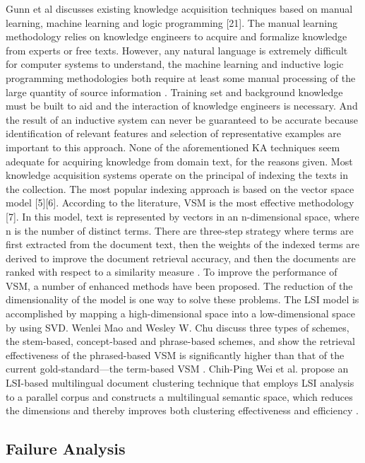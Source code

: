 \documentclass{elsarticle}
\begin{document}
Gunn et al discusses existing knowledge acquisition techniques based
on manual learning, machine learning and logic programming [21]. The
manual learning methodology relies on knowledge engineers to acquire
and formalize knowledge from experts or free texts. However, any
natural language is extremely difficult for computer systems to
understand, the machine learning and inductive logic programming
methodologies both require at least some manual processing of the
large quantity of source information \cite{matwin:tac,Richardson1997}. Training set and background knowledge must be built to aid and the interaction of knowledge engineers is necessary. And the result of an inductive system can never be guaranteed to be accurate because identification of relevant features and selection of representative examples are important to this approach. None of the aforementioned KA techniques seem adequate for acquiring knowledge from domain text, for the reasons given. 
Most knowledge acquisition systems operate on the principal of
indexing the texts in the collection. The most popular indexing
approach is based on the vector space model [5][6]. According to the
literature, VSM is the most effective methodology [7]. In this model,
text is represented by vectors in an n-dimensional space, where n is
the number of distinct terms. There are three-step strategy where
terms are first extracted from the document text, then the weights of
the indexed terms are derived to improve the document retrieval
accuracy, and then the documents are ranked with respect to a
similarity measure \cite{Raghavan1986}. To improve the performance of
VSM, a number of enhanced methods have been proposed. The reduction of
the dimensionality of the model is one way to solve these
problems. The LSI model is accomplished by mapping a high-dimensional
space into a low-dimensional space by using SVD. Wenlei Mao and Wesley
W. Chu discuss three types of schemes, the stem-based, concept-based
and phrase-based schemes, and show the retrieval effectiveness of the
phrased-based VSM is significantly higher than that of the current
gold-standard—the term-based VSM \cite{Mao2007}. Chih-Ping Wei et
al. propose an LSI-based multilingual document clustering technique
that employs LSI analysis to a parallel corpus and constructs a
multilingual semantic space, which reduces the dimensions and thereby
improves both clustering effectiveness and efficiency \cite{Wei2008}.

\subsection{Failure Analysis
}
\label{sec:failure-analysis-}
\end{document}

